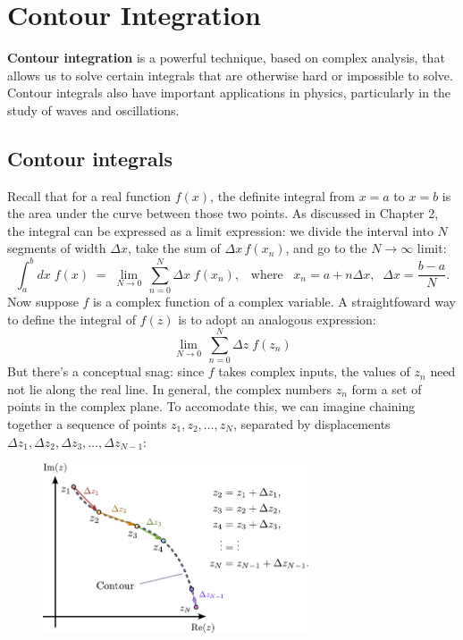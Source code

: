 \documentclass[10pt,a4paper]{article}
\begin{document}
\setcounter{page}{59}

\section{Contour Integration}
\label{contour-integration}

\textbf{Contour integration} is a powerful technique, based on complex
analysis, that allows us to solve certain integrals that are otherwise
hard or impossible to solve. Contour integrals also have important
applications in physics, particularly in the study of waves and
oscillations.

\subsection{Contour integrals}
\label{contour-integrals}

Recall that for a real function $f(x)$, the definite integral from
$x=a$ to $x=b$ is the area under the curve between those two points.
As discussed in Chapter 2, the integral can be expressed as a limit
expression: we divide the interval into $N$ segments of width $\Delta
x$, take the sum of $\Delta x\, f(x_n)$, and go to the $N \rightarrow
\infty$ limit:
\begin{equation}
\int_a^b dx\; f(x) \;=\; \lim_{N \rightarrow 0} \, \sum_{n=0}^{N} \Delta x\; f(x_n), \;\;\;\mathrm{where}\;\;\;x_n = a + n\Delta x, \;\;\Delta x = \frac{b-a}{N}.
\end{equation}
Now suppose $f$ is a complex function of a complex variable. A
straightfoward way to define the integral of $f(z)$ is to adopt an
analogous expression:
\begin{equation}
\lim_{N \rightarrow 0} \, \sum_{n=0}^{N} \Delta z\; f(z_n)
\end{equation}
But there's a conceptual snag: since $f$ takes complex inputs, the
values of $z_n$ need not lie along the real line. In general, the
complex numbers $z_n$ form a set of points in the complex plane. To
accomodate this, we can imagine chaining together a sequence of points
$z_1, z_2, \dots, z_N$, separated by displacements $\Delta z_1, \Delta
z_2, \Delta z_3, \dots, \Delta z_{N-1}$:

\begin{figure}[ht]
  \centering\includegraphics[width=0.7\textwidth]{complex_integral}
\end{figure}
\end{document}
